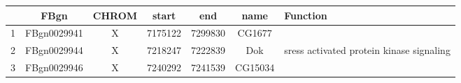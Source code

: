 \centering \begin{tabular}{c|c|c|c|c|c | p{2in}}
&FBgn	&CHROM	&start	&end	&name & Function\\\hline
1	&FBgn0029941	&X	&7175122	&7299830	&CG1677\\
2	&FBgn0029944	&X	&7218247	&7222839	&Dok & sress activated protein 
kinase signaling\\
3	&FBgn0029946	&X	&7240292	&7241539	&CG15034\\
\end{tabular}
